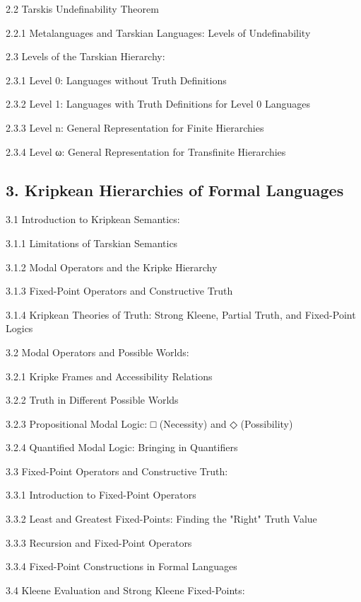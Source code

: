 2.2 Tarski\textquotesingle s Undefinability Theorem

2.2.1 Metalanguages and Tarskian Languages: Levels of Undefinability

2.3 Levels of the Tarskian Hierarchy:

2.3.1 Level 0: Languages without Truth Definitions

2.3.2 Level 1: Languages with Truth Definitions for Level 0 Languages

2.3.3 Level n: General Representation for Finite Hierarchies

2.3.4 Level ω: General Representation for Transfinite Hierarchies

\hypertarget{kripkean-hierarchies-of-formal-languages}{%
\subsection*{3. Kripkean Hierarchies of Formal
Languages}\label{kripkean-hierarchies-of-formal-languages}}

3.1 Introduction to Kripkean Semantics:

3.1.1 Limitations of Tarskian Semantics

3.1.2 Modal Operators and the Kripke Hierarchy

3.1.3 Fixed-Point Operators and Constructive Truth

3.1.4 Kripkean Theories of Truth: Strong Kleene, Partial Truth, and
Fixed-Point Logics

3.2 Modal Operators and Possible Worlds:

3.2.1 Kripke Frames and Accessibility Relations

3.2.2 Truth in Different Possible Worlds

3.2.3 Propositional Modal Logic: □ (Necessity) and ◇ (Possibility)

3.2.4 Quantified Modal Logic: Bringing in Quantifiers

3.3 Fixed-Point Operators and Constructive Truth:

3.3.1 Introduction to Fixed-Point Operators

3.3.2 Least and Greatest Fixed-Points: Finding the "Right" Truth Value

3.3.3 Recursion and Fixed-Point Operators

3.3.4 Fixed-Point Constructions in Formal Languages

3.4 Kleene Evaluation and Strong Kleene Fixed-Points:

